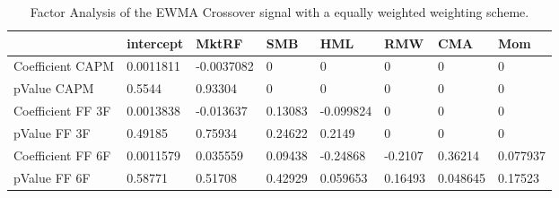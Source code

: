 \begin{table}[H]
\centering
\begin{tabular}{llllllll}
\hline& intercept & MktRF & SMB & HML & RMW & CMA & Mom \\ 
\hline 
Coefficient CAPM & 0.0011811 & -0.0037082 & 0 & 0 & 0 & 0 & 0 \\ 
pValue CAPM & 0.5544 & 0.93304 & 0 & 0 & 0 & 0 & 0 \\ 
Coefficient FF 3F & 0.0013838 & -0.013637 & 0.13083 & -0.099824 & 0 & 0 & 0 \\ 
pValue FF 3F & 0.49185 & 0.75934 & 0.24622 & 0.2149 & 0 & 0 & 0 \\ 
Coefficient FF 6F & 0.0011579 & 0.035559 & 0.09438 & -0.24868 & -0.2107 & 0.36214 & 0.077937 \\ 
pValue FF 6F & 0.58771 & 0.51708 & 0.42929 & 0.059653 & 0.16493 & 0.048645 & 0.17523 \\ 
\hline
\end{tabular}
\caption{Factor Analysis of the EWMA Crossover signal with a equally weighted weighting scheme.}
\label{MBBSEWNR_FACTOR}
\end{table}